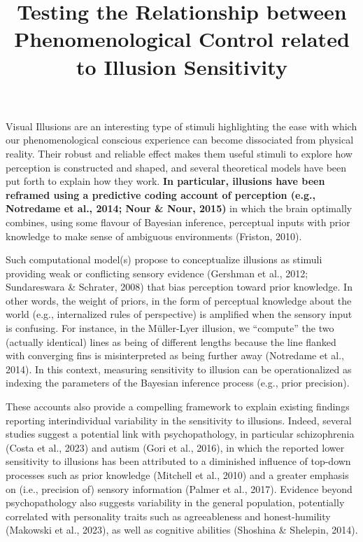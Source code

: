 \documentclass[
  man,
  floatsintext,
  longtable,
  nolmodern,
  notxfonts,
  notimes,
  colorlinks=true,linkcolor=blue,citecolor=blue,urlcolor=blue]{apa7}
\title{Testing the Relationship between Phenomenological Control related
to Illusion Sensitivity}
\affiliation{
{School of Psychology, University of Sussex}}
\begin{document}
\maketitle


\setcounter{secnumdepth}{-\maxdimen} %

\setlength\LTleft{0pt}

\resetlinenumber[1]



Visual Illusions are an interesting type of stimuli highlighting the
ease with which our phenomenological conscious experience can become
dissociated from physical reality. Their robust and reliable effect
makes them useful stimuli to explore how perception is constructed and
shaped, and several theoretical models have been put forth to explain
how they work. \textbf{In particular, illusions have been reframed using
a predictive coding account of perception (e.g., Notredame et al., 2014;
Nour \& Nour, 2015)} in which the brain optimally combines, using some
flavour of Bayesian inference, perceptual inputs with prior knowledge to
make sense of ambiguous environments (Friston, 2010).

Such computational model(s) propose to conceptualize illusions as
stimuli providing weak or conflicting sensory evidence (Gershman et al.,
2012; Sundareswara \& Schrater, 2008) that bias perception toward prior
knowledge. In other words, the weight of priors, in the form of
perceptual knowledge about the world (e.g., internalized rules of
perspective) is amplified when the sensory input is confusing. For
instance, in the Müller-Lyer illusion, we ``compute'' the two (actually
identical) lines as being of different lengths because the line flanked
with converging fins is misinterpreted as being further away (Notredame
et al., 2014). In this context, measuring sensitivity to illusion can be
operationalized as indexing the parameters of the Bayesian inference
process (e.g., prior precision).

These accounts also provide a compelling framework to explain existing
findings reporting interindividual variability in the sensitivity to
illusions. Indeed, several studies suggest a potential link with
psychopathology, in particular schizophrenia (Costa et al., 2023) and
autism (Gori et al., 2016), in which the reported lower sensitivity to
illusions has been attributed to a diminished influence of top-down
processes such as prior knowledge (Mitchell et al., 2010) and a greater
emphasis on (i.e., precision of) sensory information (Palmer et al.,
2017). Evidence beyond psychopathology also suggests variability in the
general population, potentially correlated with personality traits such
as agreeableness and honest-humility (Makowski et al., 2023), as well as
cognitive abilities (Shoshina \& Shelepin, 2014).
\end{document}
